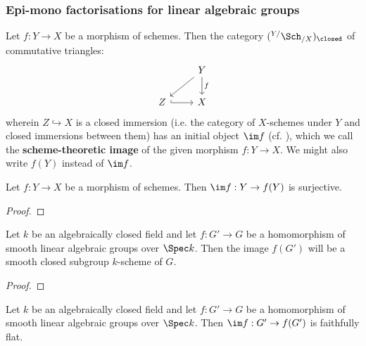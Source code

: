         \subsubsection{Epi-mono factorisations for linear algebraic groups}
            \begin{definition} \label{def: scheeme_theoretic_images}
                Let $f: Y \to X$ be a morphism of schemes. Then the category $({}^{Y/}\Sch_{/X})_{\closed}$ of commutative triangles:
                    $$
                        \begin{tikzcd}
                        	& Y \\
                        	Z & X
                        	\arrow["f", from=1-2, to=2-2]
                        	\arrow["", hook, from=2-1, to=2-2]
                        	\arrow[""', from=1-2, to=2-1]
                        \end{tikzcd}
                    $$
                wherein $Z \hookrightarrow X$ is a closed immersion (i.e. the category of $X$-schemes under $Y$ and closed immersions between them) has an initial object $\im f$ (cf. \cite[\href{https://stacks.math.columbia.edu/tag/01R6}{Tag 01R6}]{stacks}), which we call the \textbf{scheme-theoretic image} of the given morphism $f: Y \to X$. We might also write $f(Y)$ instead of $\im f$.
            \end{definition}
            \begin{proposition} \label{prop: morphisms_surject_onto_images}
                Let $f: Y \to X$ be a morphism of schemes. Then $\im f: Y \to f(Y)$ is surjective.
            \end{proposition}
                \begin{proof}
                    
                \end{proof}
            \begin{lemma} \label{lemma: the_closed_orbit_lemma}
                Let $k$ be an algebraically closed field and let $f: G' \to G$ be a homomorphism of smooth linear algebraic groups over $\Spec k$. Then the image $f(G')$ will be a smooth closed subgroup $k$-scheme of $G$.
            \end{lemma}
                \begin{proof}
                    
                \end{proof}
            \begin{proposition} \label{prop: surjections_onto_images_of_linear_algebraic_group_homomorphisms_are_faithfully_flat}
                Let $k$ be an algebraically closed field and let $f: G' \to G$ be a homomorphism of smooth linear algebraic groups over $\Spec k$. Then $\im f: G' \to f(G')$ is faithfully flat. 
            \end{proposition}
